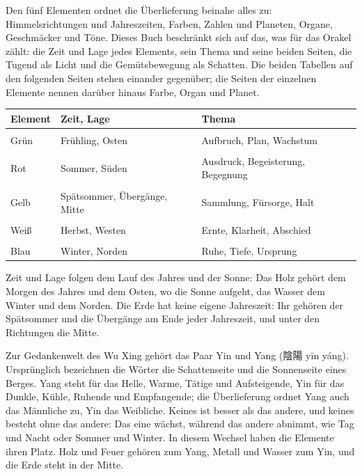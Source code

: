 \documentclass[12pt,paper=a5,DIV=13,headings=small,twoside=true,open=any]{scrbook}
\makeatletter
\newlength{\normalparindent}
\newenvironment{einleitung}
  {\par\justifying\setlength{\parindent}{\normalparindent}\setlength{\parskip}{0pt}}
  {\par}
\newcommand{\elementmitfarbe}[2]{%
  \begin{tabular}[t]{@{}c@{}}\element{#1}\\[-0.3ex]{\scriptsize #2}\end{tabular}}
\newcommand{\linkeseite}{\clearpage\ifodd\value{page}\hbox{}\thispagestyle{empty}\clearpage\fi}
\makeatother
\begin{document}
\begin{einleitung}
Den fünf Elementen ordnet die Überlieferung beinahe alles zu: Himmelsrichtungen und Jahreszeiten, Farben, Zahlen und Planeten, Organe, Geschmäcker und Töne. Dieses Buch beschränkt sich auf das, was für das Orakel zählt: die Zeit und Lage jedes Elements, sein Thema und seine beiden Seiten, die Tugend als Licht und die Gemütsbewegung als Schatten. Die beiden Tabellen auf den folgenden Seiten stehen einander gegenüber; die Seiten der einzelnen Elemente nennen darüber hinaus Farbe, Organ und Planet.
\end{einleitung}

\linkeseite
{}\par\smallskip
\begin{center}
\small\setlength{\tabcolsep}{4pt}\renewcommand{\arraystretch}{1}
\begin{tabularx}{\textwidth}{@{}p{}>{\raggedright\arraybackslash}p{}>{\raggedright\arraybackslash}X@{}}
\toprule
\textbf{Element} & \textbf{Zeit, Lage} & \textbf{Thema} \\
\midrule
\elementmitfarbe{Holz}{Grün}\rule[-2.2em]{0pt}{1em} & Frühling, Osten & Aufbruch, Plan, Wachstum \\[0.3em]
\elementmitfarbe{Feuer}{Rot}\rule[-2.2em]{0pt}{1em} & Sommer, Süden & Ausdruck, Begeisterung, Begegnung \\[0.3em]
\elementmitfarbe{Erde}{Gelb}\rule[-2.2em]{0pt}{1em} & Spätsommer, Übergänge, Mitte & Sammlung, Fürsorge, Halt \\[0.3em]
\elementmitfarbe{Metall}{Weiß}\rule[-2.2em]{0pt}{1em} & Herbst, Westen & Ernte, Klarheit, Abschied \\[0.3em]
\elementmitfarbe{Wasser}{Blau}\rule[-2.2em]{0pt}{1em} & Winter, Norden & Ruhe, Tiefe, Ursprung \\[0.3em]
\bottomrule
\end{tabularx}
\end{center}

\begin{einleitung}
{\small Zeit und Lage folgen dem Lauf des Jahres und der Sonne: Das Holz gehört dem Morgen des Jahres und dem Osten, wo die Sonne aufgeht, das Wasser dem Winter und dem Norden. Die Erde hat keine eigene Jahreszeit: Ihr gehören der Spätsommer und die Übergänge am Ende jeder Jahreszeit, und unter den Richtungen die Mitte.\par}

Zur Gedankenwelt des Wu Xing gehört das Paar Yin und Yang ({\cjk 陰陽} yīn yáng). Ursprünglich bezeichnen die Wörter die Schattenseite und die Sonnenseite eines Berges. Yang steht für das Helle, Warme, Tätige und Aufsteigende, Yin für das Dunkle, Kühle, Ruhende und Empfangende; die Überlieferung ordnet Yang auch das Männliche zu, Yin das Weibliche. Keines ist besser als das andere, und keines besteht ohne das andere: Das eine wächst, während das andere abnimmt, wie Tag und Nacht oder Sommer und Winter. In diesem Wechsel haben die Elemente ihren Platz. Holz und Feuer gehören zum Yang, Metall und Wasser zum Yin, und die Erde steht in der Mitte.
\end{einleitung}
\end{document}
